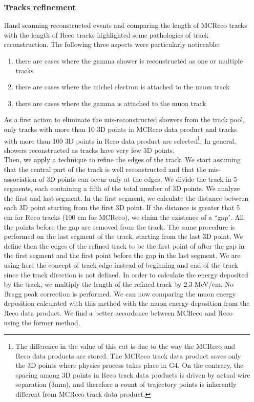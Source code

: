 \documentclass[a4paper, 10pt]{article}
\begin{document}
\subsubsection{Tracks refinement}
\label{trackRef}
Hand scanning reconstructed events and comparing the  length of MCReco tracks with the length of Reco tracks highlighted some pathologies of track reconstruction. The following three aspects were particularly noticeable:
\begin{enumerate}[topsep=10pt,itemsep=-1ex,partopsep=10pt,parsep=1ex]
\item there are cases where the gamma shower is reconstructed as one or multiple tracks
\item there are cases where the michel electron is attached to the muon track
\item there are cases where the gamma is attached to the muon track
\end{enumerate}


As a first action to eliminate the mis-reconstructed showers from the track pool, only tracks with more than 10 3D points in MCReco data product and tracks with more than 100 3D points in Reco data product are selected\footnote{The difference in the value of this cut is due to the way the MCReco and Reco data products are stored. The MCReco track data product saves only the 3D points where physics process takes place in G4. On the contrary, the spacing among 3D points in Reco track data products is driven by actual wire separation (3mm), and therefore a count of trajectory points is inherently different from MCReco track data product.}. In general, showers reconstructed as tracks have very few 3D points.  \\
Then, we apply a technique to refine the edges of the track. We start assuming that the central part of the track is well reconstructed and that the mis-association of 3D points can occur only at the edges. We divide the track in 5 segments, each containing a fifth of the total number of 3D points. We analyze the first and last segment. In the first segment, we calculate the distance between each 3D point starting from the first 3D point. If the distance is greater that 5 cm for Reco tracks (100 cm for MCReco), we claim the existence of a ``gap". All the points before the gap are removed from the track. The same procedure is performed on the last segment of the track, starting from the last 3D point. We define then the edges of the refined track to be the first point of after the gap in the first segment and the first point before the gap in the last segment. We are using here the concept of track edge instead of beginning and end of the track since the track direction is not defined. In order to calculate the energy deposited by the track, we multiply the length of the refined track by 2.3 MeV/cm. No Bragg peak correction is performed. We can now comparing the muon energy deposition calculated with this method with the muon energy deposition from the Reco data product. We find a better accordance between MCReco and Reco using the former method.
\end{document}

